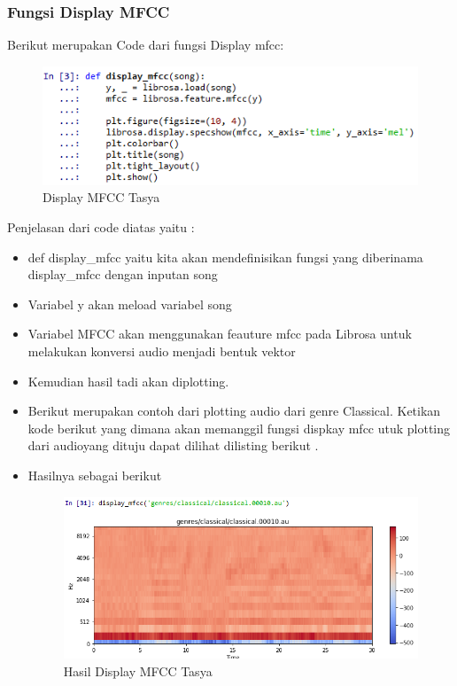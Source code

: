 \begin{enumerate}
\begin{itemize}
\subsubsection{Fungsi Display MFCC}
Berikut merupakan Code dari fungsi Display mfcc: \\
\begin{figure}[ht]
\centering
\includegraphics[scale=0.5]{figures/chapter6tasya8.png}
\caption{Display MFCC Tasya}
\label{Praktek}
\end{figure}
Penjelasan dari code diatas yaitu :
\begin{itemize}
\item def display\_mfcc yaitu kita akan mendefinisikan fungsi yang diberinama display\_mfcc dengan inputan song
\item Variabel y akan meload variabel song
\item Variabel MFCC akan menggunakan feauture mfcc pada Librosa untuk melakukan konversi audio menjadi bentuk vektor
\item Kemudian hasil tadi akan diplotting.
\item Berikut merupakan contoh dari plotting audio dari genre Classical. Ketikan kode berikut  yang dimana akan memanggil fungsi dispkay mfcc utuk plotting dari audioyang dituju dapat dilihat dilisting berikut .

\item Hasilnya sebagai berikut 
\begin{figure}[ht]
\centering
\includegraphics[scale=0.5]{figures/chapter6tasya24.png}
\caption{Hasil Display MFCC Tasya}
\label{Praktek}
\end{figure}
\end{itemize}


\end{itemize}
\end{enumerate}

